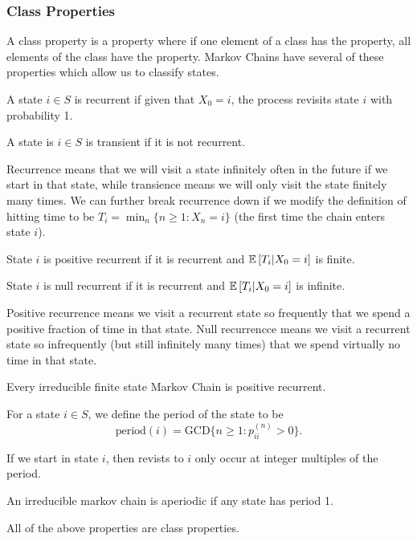 \subsubsection{Class Properties}
A class property is a property where if one element of a class has the property, all elements of the class have the property.
Markov Chains have several of these properties which allow us to classify states.
\begin{definition}
	A state $i\in S$ is recurrent if given that $X_0=i$, the process revisits state $i$ with probability 1.
	\label{defn:markov-recurrence}
\end{definition}
\begin{definition}
	A state is $i\in S$ is transient if it is not recurrent.
	\label{defn:markov-transience}
\end{definition}
Recurrence means that we will visit a state infinitely often in the future if we start in that state, while transience means we will only visit the state finitely many times.
We can further break recurrence down if we modify the definition of hitting time to be $T_i = \min_n \{ n \geq 1 : X_n=i \}$ (the first time the chain enters state $i$).
\begin{definition}
	State $i$ is positive recurrent if it is recurrent and $\mathbb{E}\left[T_i|X_0=i\right]$ is finite.
	\label{defn:positive-recurrence}
\end{definition}
\begin{definition}
	State $i$ is null recurrent if it is recurrent and $\mathbb{E}\left[T_i|X_0=i\right]$ is infinite.
	\label{defn:null-recurrence}
\end{definition}
Positive recurrence means we visit a recurrent state so frequently that we spend a positive fraction of time in that state.
Null recurrencce means we visit a recurrent state so infrequently (but still infinitely many times) that we spend virtually no time in that state.
\begin{theorem}
	Every irreducible finite state Markov Chain is positive recurrent.
	\label{thm:positive-recurrence}
\end{theorem}
\begin{definition}
	For a state $i\in S$, we define the period of the state to be
	\[
		\text{period}(i) = \text{GCD}\{n\geq 1 : p_{ii}^{(n)} > 0 \}.
	\]
	\label{defn:period}
\end{definition}
If we start in state $i$, then revists to $i$ only occur at integer multiples of the period.
\begin{definition}
	An irreducible markov chain is aperiodic if any state has period 1.
	\label{defn:aperiodic-mc}
\end{definition}
All of the above properties are class properties.
